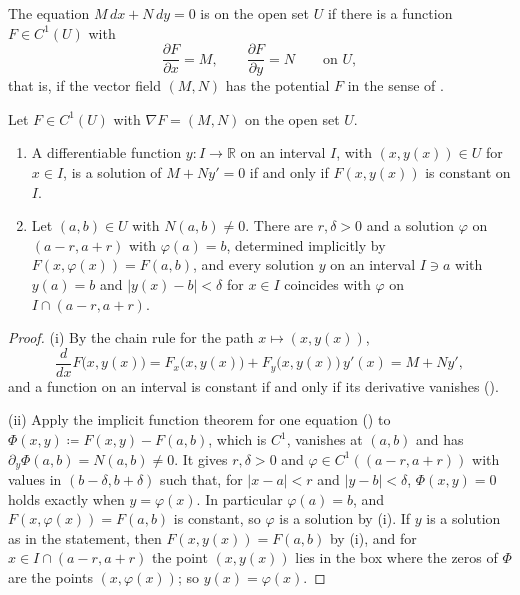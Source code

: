 \begin{definition}
\label{def:exact}
The equation $M\,dx+N\,dy=0$ is  on the open set $U$ if there is a function $F\in C^1(U)$ with
\[
\frac{\partial F}{\partial x}=M,\qquad\frac{\partial F}{\partial y}=N\qquad\text{on }U ,
\]
that is, if the vector field $(M,N)$ has the potential $F$ in the sense of .
\end{definition}

\begin{theorem}
\label{thm:exact-solutions}
Let $F\in C^1(U)$ with $\nabla F=(M,N)$ on the open set $U$.
\begin{enumerate}
\item A differentiable function $y\colon I\to\mathbb R$ on an interval $I$, with $(x,y(x))\in U$ for $x\in I$, is a solution of $M+Ny'=0$ if and only if $F(x,y(x))$ is constant on $I$.
\item Let $(a,b)\in U$ with $N(a,b)\ne0$. There are $r,\delta>0$ and a solution $\varphi$ on $(a-r,a+r)$ with $\varphi(a)=b$, determined implicitly by $F(x,\varphi(x))=F(a,b)$, and every solution $y$ on an interval $I\ni a$ with $y(a)=b$ and $|y(x)-b|<\delta$ for $x\in I$ coincides with $\varphi$ on $I\cap(a-r,a+r)$.
\end{enumerate}
\end{theorem}

\begin{proof}
(i) By the chain rule  for the path $x\mapsto(x,y(x))$,
\[
\frac d{dx}F\bigl(x,y(x)\bigr)=F_x\bigl(x,y(x)\bigr)+F_y\bigl(x,y(x)\bigr)\,y'(x)=M+Ny' ,
\]
and a function on an interval is constant if and only if its derivative vanishes ().

(ii) Apply the implicit function theorem for one equation () to $\Phi(x,y)\coloneqq F(x,y)-F(a,b)$, which is $C^1$, vanishes at $(a,b)$ and has $\partial_y\Phi(a,b)=N(a,b)\ne0$. It gives $r,\delta>0$ and $\varphi\in C^1((a-r,a+r))$ with values in $(b-\delta,b+\delta)$ such that, for $|x-a|<r$ and $|y-b|<\delta$, $\Phi(x,y)=0$ holds exactly when $y=\varphi(x)$. In particular $\varphi(a)=b$, and $F(x,\varphi(x))=F(a,b)$ is constant, so $\varphi$ is a solution by (i). If $y$ is a solution as in the statement, then $F(x,y(x))=F(a,b)$ by (i), and for $x\in I\cap(a-r,a+r)$ the point $(x,y(x))$ lies in the box where the zeros of $\Phi$ are the points $(x,\varphi(x))$; so $y(x)=\varphi(x)$.
\end{proof}

